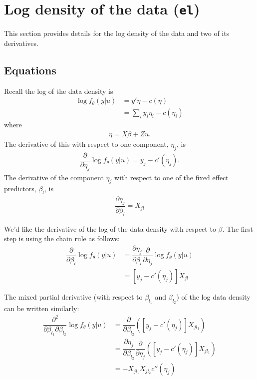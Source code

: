 \documentclass{article}
\begin{document}
\section{Log density of the data (\texttt{el})}\label{sec:el}
This section provides details for the log density of the data and two of its derivatives.  

\subsection{Equations}
Recall the log of the data density is
\begin{align}
\log f_\theta(y|u) &= y' \eta -c(\eta) \\
&= \sum_{i} y_{i} {\eta_{i}} - c({\eta_{i}})
\end{align}
where
\begin{align}
\eta=X\beta+Zu.
\end{align}
The derivative of this with respect to one component, $\eta_j$, is
\begin{align}
\dfrac{\partial}{\partial \eta_j} \log f_\theta(y|u)  = y_j-c'(\eta_j).
\end{align}
The derivative of the component $\eta_j$ with respect to one of the fixed effect predictors, $\beta_{l}$, is
\begin{align}
\dfrac{\partial \eta_j}{\partial \beta_{l}} = X_{j{l}}
\end{align}

We'd like the derivative of the log of the data density with respect to $\beta$. The first step is using the chain rule as follows:
\begin{align}
\dfrac{\partial}{\partial \beta_{l}}  \log f_\theta(y|u) &= \dfrac{\partial \eta_j}{\partial \beta_{l}} \dfrac{\partial}{\partial \eta_j} \log f_\theta(y|u) \\
&= \left[ y_j-c'(\eta_j) \right]  X_{j{l}}
\end{align}

The mixed partial derivative (with respect to $\beta_{l_1}$ and $\beta_{l_2}$) of the log data density can be written similarly:
\begin{align}
\dfrac{\partial^2}{\partial \beta_{l_1} \partial \beta_{l_2}}  \log f_\theta(y|u) &=\dfrac{\partial}{\partial \beta_{l_2}} \left( \left[ y_j-c'(\eta_j) \right]  X_{j{l_1}} \right) \\
&= \dfrac{\partial \eta_j}{\partial \beta_{l_2}} \dfrac{\partial}{\partial \eta_j} \left( \left[ y_j-c'(\eta_j) \right]  X_{j{l_1}} \right) \\
&= -X_{j{l_1}} X_{j{l_2}} c''(\eta_j) 
 \end{align}
\end{document}

